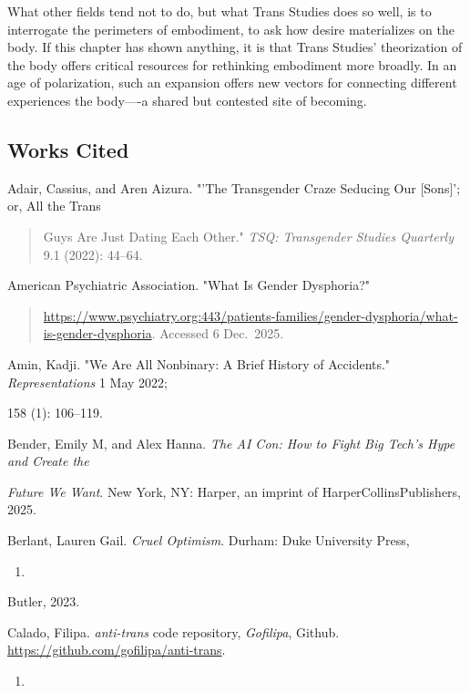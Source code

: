 \documentclass[11pt]{article}
\begin{document}
What other fields tend not to do, but what Trans Studies does so well,
is to interrogate the perimeters of embodiment, to ask how desire
materializes on the body. If this chapter has shown anything, it is
that Trans Studies’ theorization of the body offers critical resources
for rethinking embodiment more broadly. In an age of polarization,
such an expansion offers new vectors for connecting different
experiences the body—-a shared but contested site of becoming.

\subsection{Works Cited}
\label{sec:org1f0abf9}

Adair, Cassius, and Aren Aizura. "'The Transgender Craze Seducing Our
[Sons]'; or, All the Trans

\begin{quote}
Guys Are Just Dating Each Other." \emph{TSQ: Transgender Studies Quarterly}
9.1 (2022): 44--64.
\end{quote}

American Psychiatric Association. "What Is Gender Dysphoria?"

\begin{quote}
\url{https://www.psychiatry.org:443/patients-families/gender-dysphoria/what-is-gender-dysphoria}.
Accessed 6 Dec. 2025.
\end{quote}

Amin, Kadji. "We Are All Nonbinary: A Brief History of Accidents."
\emph{Representations} 1 May 2022;

158 (1): 106--119.

Bender, Emily M, and Alex Hanna. \emph{The AI Con: How to Fight Big Tech's
Hype and Create the}

\emph{Future We Want}. New York, NY: Harper, an imprint of
HarperCollinsPublishers, 2025.

Berlant, Lauren Gail. \emph{Cruel Optimism}. Durham: Duke University Press,
\begin{enumerate}
\item 
\end{enumerate}

Butler, 2023.

Calado, Filipa. \emph{anti-trans} code repository, \emph{Gofilipa}, Github.
\url{https://github.com/gofilipa/anti-trans}.

\begin{enumerate}
\item 
\end{enumerate}
\end{document}
